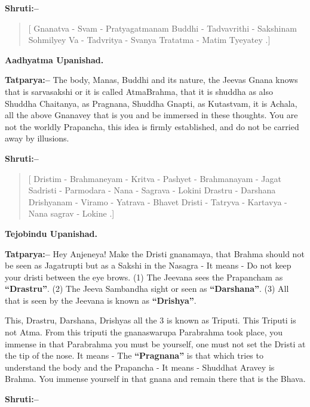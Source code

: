 \textbf{Shruti:–}

\begin{verse}
[ Gnanatva - Svam - Pratyagatmanam Buddhi - Tadva\break vrithi - Sakshinam  Sohmilyey Va - Tadvritya - Svanya Tratatma - Matim Tyeyatey .]
\end{verse}

\begin{flushright}
\textbf{Aadhyatma Upanishad.}
\end{flushright}

\textbf{Tatparya:–} The body, Manas, Buddhi and its nature, the Jeevas Gnana knows that is sarvasakshi or it is called AtmaBrahma, that it is shuddha as also Shuddha Chaitanya, as Pragnana, Shuddha Gnapti, as Kutastvam, it is Achala, all the above Gnanavey that is you and be immersed in these thoughts. You are not the worldly Prapancha, this idea is firmly established, and do not be carried away by illusions.

\textbf{Shruti:–}

\begin{verse}
[ Dristim - Brahmaneyam - Kritva - Pashyet - Brahma\break nayam - Jagat  Sadristi - Parmodara - Nana - Sagrava - Lokini  Drastru - Darshana Drishyanam - Viramo - Yatrava - Bhavet  Dristi - Tatryva - Kartavya - Nana sagrav - Lokine .]
\end{verse}

\begin{flushright}
\textbf{Tejobindu Upanishad.}
\end{flushright}

\textbf{Tatparya:–} Hey Anjeneya! Make the Dristi gnanamaya, that Brahma should not be seen as Jagatrupti but as a Sakshi in the Nasagra - It means - Do not keep your dristi between the eye brows. (1) The Jeevana sees the Prapancham as \textbf{“Drastru”}. (2) The Jeeva Sambandha sight or seen as \textbf{“Darshana”}. (3) All that is seen by the Jeevana is known as \textbf{“Drishya”}.

This, Drastru, Darshana, Drishyas all the 3 is known as Triputi. This Triputi is not Atma. From this triputi the gnanaswarupa Parabrahma took place, you immense in that Parabrahma you must be yourself, one must not set the Dristi at the tip of the nose. It means - The \textbf{“Pragnana”} is that which tries to understand the body and the Prapancha - It means - Shuddhat Aravey is Brahma. You immense yourself in that gnana and remain there that is the Bhava.

\textbf{Shruti:–}

